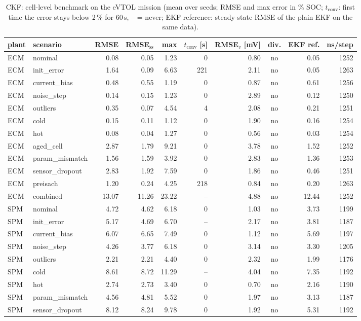 \begin{table}[H]\centering\footnotesize\setlength{\tabcolsep}{4pt}
\caption{CKF: cell-level benchmark on the eVTOL mission (mean over seeds; RMSE and max error in \% SOC; $t_\mathrm{conv}$: first time the error stays below 2\,\% for 60\,s, -- = never; EKF reference: steady-state RMSE of the plain EKF on the same data).}\label{tab:cell_CKF}
\begin{tabular}{llrrrrrcrr}\toprule
plant & scenario & RMSE & RMSE$_\mathrm{ss}$ & max & $t_\mathrm{conv}$ [s] & RMSE$_v$ [mV] & div. & EKF ref. & ns/step \\ \midrule
ECM & nominal & 0.08 & 0.05 & 1.23 & 0 & 0.80 & no & 0.05 & 1252 \\
ECM & init\_error & 1.64 & 0.09 & 6.63 & 221 & 2.11 & no & 0.05 & 1263 \\
ECM & current\_bias & 0.48 & 0.55 & 1.19 & 0 & 0.87 & no & 0.61 & 1256 \\
ECM & noise\_step & 0.14 & 0.15 & 1.23 & 0 & 2.89 & no & 0.12 & 1250 \\
ECM & outliers & 0.35 & 0.07 & 4.54 & 4 & 2.08 & no & 0.21 & 1251 \\
ECM & cold & 0.15 & 0.11 & 1.12 & 0 & 1.90 & no & 0.16 & 1254 \\
ECM & hot & 0.08 & 0.04 & 1.27 & 0 & 0.56 & no & 0.03 & 1254 \\
ECM & aged\_cell & 2.87 & 1.79 & 9.21 & 0 & 3.78 & no & 1.52 & 1252 \\
ECM & param\_mismatch & 1.56 & 1.59 & 3.92 & 0 & 2.83 & no & 1.36 & 1253 \\
ECM & sensor\_dropout & 2.83 & 1.92 & 7.59 & 0 & 1.86 & no & 0.46 & 1251 \\
ECM & preisach & 1.20 & 0.24 & 4.25 & 218 & 0.84 & no & 0.20 & 1263 \\
ECM & combined & 13.07 & 11.26 & 23.22 & -- & 4.88 & no & 12.44 & 1252 \\
\midrule
SPM & nominal & 4.72 & 4.62 & 6.18 & 0 & 1.03 & no & 3.73 & 1199 \\
SPM & init\_error & 5.17 & 4.69 & 6.70 & -- & 2.17 & no & 3.81 & 1187 \\
SPM & current\_bias & 6.07 & 6.65 & 7.49 & 0 & 1.12 & no & 5.69 & 1197 \\
SPM & noise\_step & 4.26 & 3.77 & 6.18 & 0 & 3.14 & no & 3.30 & 1205 \\
SPM & outliers & 2.21 & 2.21 & 4.40 & 0 & 2.32 & no & 1.99 & 1176 \\
SPM & cold & 8.61 & 8.72 & 11.29 & -- & 4.04 & no & 7.35 & 1192 \\
SPM & hot & 2.74 & 2.73 & 3.40 & 0 & 0.70 & no & 2.16 & 1190 \\
SPM & param\_mismatch & 4.56 & 4.81 & 5.52 & 0 & 1.97 & no & 3.13 & 1187 \\
SPM & sensor\_dropout & 8.12 & 8.24 & 9.78 & 0 & 1.92 & no & 5.31 & 1192 \\
\bottomrule\end{tabular}\end{table}

